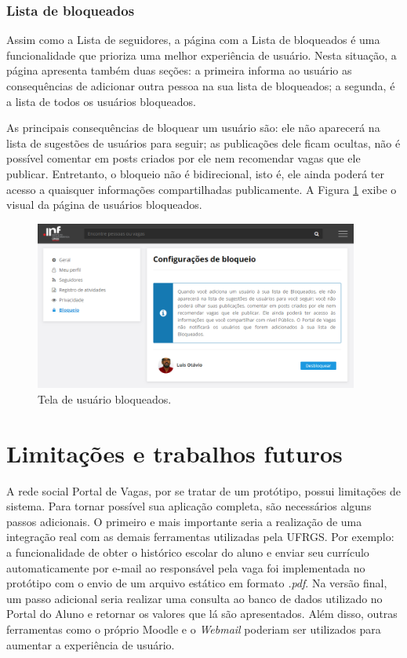 \documentclass[cic,tc]{iiufrgs}
\begin{document}
\subsubsection{Lista de bloqueados}
\label{PDVFunConfiguracoesBloq}

Assim como a Lista de seguidores, a página com a Lista de bloqueados é uma funcionalidade que prioriza uma melhor experiência de usuário. Nesta situação, a página apresenta também duas seções: a primeira informa ao usuário as consequências de adicionar outra pessoa na sua lista de bloqueados; a segunda, é a lista de todos os usuários bloqueados.

As principais consequências de bloquear um usuário são: ele não aparecerá na lista de sugestões de usuários para seguir; as publicações dele ficam ocultas, não é possível comentar em posts criados por ele nem recomendar vagas que ele publicar. Entretanto, o bloqueio não é bidirecional, isto é, ele ainda poderá ter acesso a quaisquer informações compartilhadas publicamente. A Figura \ref{telaConfigBloq} exibe o visual da página de usuários bloqueados.

\begin{figure}[ht]
    \caption{Tela de usuário bloqueados.}
        \begin{center}
            \includegraphics[width=0.95\textwidth]{figuras/config_04.png}
        \end{center}
    \label{telaConfigBloq}
\end{figure}

\section{Limitações e trabalhos futuros}
\label{redeLimitacao}

A rede social Portal de Vagas, por se tratar de um protótipo, possui limitações de sistema. Para tornar possível sua aplicação completa, são necessários alguns passos adicionais. O primeiro e mais importante seria a realização de uma integração real com as demais ferramentas utilizadas pela UFRGS. Por exemplo: a funcionalidade de obter o histórico escolar do aluno e enviar seu currículo automaticamente por e-mail ao responsável pela vaga foi implementada no protótipo com o envio de um arquivo estático em formato \textit{.pdf}. Na versão final, um passo adicional seria realizar uma consulta ao banco de dados utilizado no Portal do Aluno e retornar os valores que lá são apresentados. Além disso, outras ferramentas como o próprio Moodle e o \textit{Webmail} poderiam ser utilizados para aumentar a experiência de usuário. 
\end{document}
